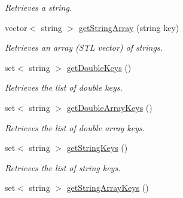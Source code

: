 \begin{DoxyCompactItemize}
\begin{DoxyCompactList}\small\item\em Retrieves a string. \end{DoxyCompactList}\item 
\hypertarget{class_rules_1_1_rules_entry_a927426eaac609851be00b31b4a1a1b01}{vector$<$ string $>$ \hyperlink{class_rules_1_1_rules_entry_a927426eaac609851be00b31b4a1a1b01}{get\-String\-Array} (string key)}\label{class_rules_1_1_rules_entry_a927426eaac609851be00b31b4a1a1b01}

\begin{DoxyCompactList}\small\item\em Retrieves an array (S\-T\-L vector) of strings. \end{DoxyCompactList}\item 
\hypertarget{class_rules_1_1_rules_entry_a4eeca5d302cf6fb165748e5a62313f51}{set$<$ string $>$ \hyperlink{class_rules_1_1_rules_entry_a4eeca5d302cf6fb165748e5a62313f51}{get\-Double\-Keys} ()}\label{class_rules_1_1_rules_entry_a4eeca5d302cf6fb165748e5a62313f51}

\begin{DoxyCompactList}\small\item\em Retrieves the list of double keys. \end{DoxyCompactList}\item 
\hypertarget{class_rules_1_1_rules_entry_a7fb228a22323fa119f44f377cd94f545}{set$<$ string $>$ \hyperlink{class_rules_1_1_rules_entry_a7fb228a22323fa119f44f377cd94f545}{get\-Double\-Array\-Keys} ()}\label{class_rules_1_1_rules_entry_a7fb228a22323fa119f44f377cd94f545}

\begin{DoxyCompactList}\small\item\em Retrieves the list of double array keys. \end{DoxyCompactList}\item 
\hypertarget{class_rules_1_1_rules_entry_a17a9fc35dde72bd13dc487d37acac17e}{set$<$ string $>$ \hyperlink{class_rules_1_1_rules_entry_a17a9fc35dde72bd13dc487d37acac17e}{get\-String\-Keys} ()}\label{class_rules_1_1_rules_entry_a17a9fc35dde72bd13dc487d37acac17e}

\begin{DoxyCompactList}\small\item\em Retrieves the list of string keys. \end{DoxyCompactList}\item 
\hypertarget{class_rules_1_1_rules_entry_a8e1823c3e98b3206f0543648f275ecd1}{set$<$ string $>$ \hyperlink{class_rules_1_1_rules_entry_a8e1823c3e98b3206f0543648f275ecd1}{get\-String\-Array\-Keys} ()}\label{class_rules_1_1_rules_entry_a8e1823c3e98b3206f0543648f275ecd1}


\end{DoxyCompactItemize}
